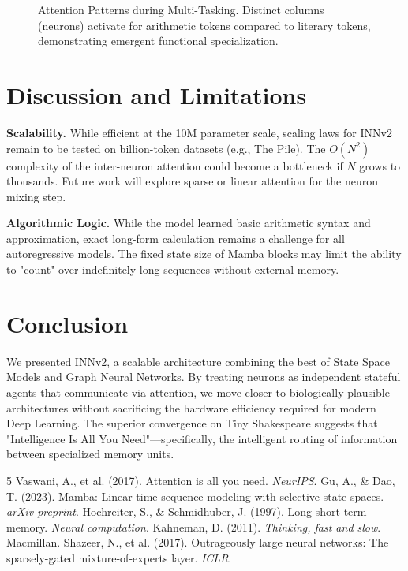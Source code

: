 \documentclass[a4paper,11pt]{article}
\begin{document}
\begin{figure}[h]
    \centering
    \caption{Attention Patterns during Multi-Tasking. Distinct columns (neurons) activate for arithmetic tokens compared to literary tokens, demonstrating emergent functional specialization.}
\end{figure}

\section{Discussion and Limitations}

\textbf{Scalability.} While efficient at the 10M parameter scale, scaling laws for INNv2 remain to be tested on billion-token datasets (e.g., The Pile). The $O(N^2)$ complexity of the inter-neuron attention could become a bottleneck if $N$ grows to thousands. Future work will explore sparse or linear attention for the neuron mixing step.

\textbf{Algorithmic Logic.} While the model learned basic arithmetic syntax and approximation, exact long-form calculation remains a challenge for all autoregressive models. The fixed state size of Mamba blocks may limit the ability to "count" over indefinitely long sequences without external memory.

\section{Conclusion}

We presented INNv2, a scalable architecture combining the best of State Space Models and Graph Neural Networks. By treating neurons as independent stateful agents that communicate via attention, we move closer to biologically plausible architectures without sacrificing the hardware efficiency required for modern Deep Learning. The superior convergence on Tiny Shakespeare suggests that "Intelligence Is All You Need"—specifically, the intelligent routing of information between specialized memory units.


\begin{thebibliography}{5}
 Vaswani, A., et al. (2017). Attention is all you need. \textit{NeurIPS}.
 Gu, A., \& Dao, T. (2023). Mamba: Linear-time sequence modeling with selective state spaces. \textit{arXiv preprint}.
 Hochreiter, S., \& Schmidhuber, J. (1997). Long short-term memory. \textit{Neural computation}.
 Kahneman, D. (2011). \textit{Thinking, fast and slow}. Macmillan.
 Shazeer, N., et al. (2017). Outrageously large neural networks: The sparsely-gated mixture-of-experts layer. \textit{ICLR}.
\end{thebibliography}
\end{document}
